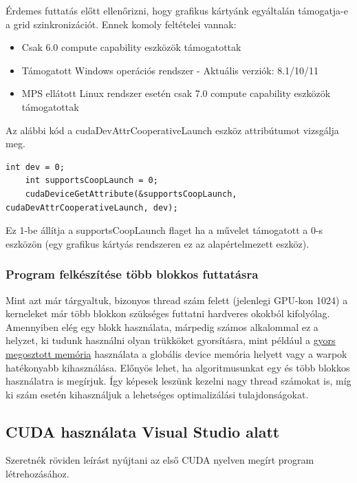 Érdemes futtatás előtt ellenőrizni, hogy grafikus kártyánk egyáltalán támogatja-e a grid szinkronizációt. Ennek komoly feltételei vannak:
\begin{itemize}
	\item Csak 6.0 compute capability eszközök támogatottak
	\item Támogatott Windows operációs rendszer - Aktuális verziók: 8.1/10/11 \cite{supportedWinOS} 
	\item MPS ellátott Linux rendszer esetén csak 7.0 compute capability eszközök támogatottak
\end{itemize}


Az alábbi kód a cudaDevAttrCooperativeLaunch eszköz attribútumot vizsgálja meg.
\begin{lstlisting}[style=CStyle]
	int dev = 0;
	int supportsCoopLaunch = 0;
	cudaDeviceGetAttribute(&supportsCoopLaunch, cudaDevAttrCooperativeLaunch, dev);
\end{lstlisting}

Ez 1-be állítja a supportsCoopLaunch flaget ha a művelet támogatott a 0-s eszközön (egy grafikus kártyás rendszeren ez az alapértelmezett eszköz).

\subsubsection{Program felkészítése több blokkos futtatásra}
Mint azt már tárgyaltuk, bizonyos thread szám felett (jelenlegi GPU-kon 1024) a kerneleket már több blokkon szükséges futtatni hardveres okokból kifolyólag. Amennyiben elég egy blokk használata, márpedig számos alkalommal ez a helyzet, ki tudunk használni olyan trükköket gyorsításra, mint például a \href{https://docs.nvidia.com/cuda/cuda-c-programming-guide/index.html#shared-memory}{gyors megosztott memória} használata a globális device memória helyett vagy a warpok hatékonyabb kihasználása. Előnyös lehet, ha algoritmusunkat egy és több blokkos használatra is megírjuk. Így képesek leszünk kezelni nagy thread számokat is, míg ki szám esetén kihasználjuk a lehetséges optimalizálási tulajdonságokat.



\subsection{CUDA használata Visual Studio alatt}

Szeretnék röviden leírást nyújtani az első CUDA nyelven megírt program létrehozásához.

